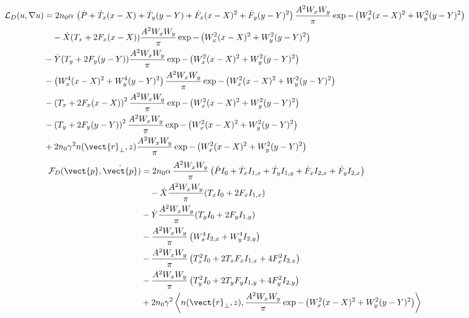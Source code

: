 \begin{equation}
    \begin{split}
    \mathcal{L}_{D}(u,\nabla u) & = 2 n_0 \alpha\, \left(\dot{P} + \dot{T}_x (x-X) + \dot{T}_y (y-Y) + \dot{F}_{x} (x-X)^2 + \dot{F}_{y} (y-Y)^2\right)\frac{A^2W_x W_y}{\pi} \exp{-\left( W_x^2(x-X)^2 + W_y^2(y-Y)^2 \right)} \\
        &\quad - \dot{X} (T_x + 2F_x(x-X)) \frac{A^2W_x W_y}{\pi} \exp{-\left( W_x^2(x-X)^2 + W_y^2(y-Y)^2 \right)}
\\
&- \dot{Y} (T_y + 2F_y(y-Y)) \frac{A^2W_x W_y}{\pi} \exp{-\left( W_x^2(x-X)^2 + W_y^2(y-Y)^2 \right)}
\\ 
        &- \left(W_x^4 (x-X)^2 +  W_y^4 (y-Y)^2\right) \frac{A^2W_x W_y}{\pi} \exp{-\left( W_x^2(x-X)^2 + W_y^2(y-Y)^2 \right)}
\\
        &- \left(T_x + 2 F_x (x-X)\right)^2 \frac{A^2W_x W_y}{\pi} \exp{-\left( W_x^2(x-X)^2 + W_y^2(y-Y)^2 \right)}
\\
        &-  \left(T_y + 2 F_{y} (y-Y)\right)^2 \frac{A^2W_x W_y}{\pi} \exp{-\left( W_x^2(x-X)^2 + W_y^2(y-Y)^2 \right)}
\\
        &+ 2n_0 \gamma^2 n(\vect{r}_{\perp},z) \frac{A^2W_x W_y}{\pi} \exp{-\left( W_x^2(x-X)^2 + W_y^2(y-Y)^2 \right)} \\
    \end{split}
\end{equation}
\begin{equation}
    \begin{split}
 \mathcal{F}_{D}(\vect{p},\dot{\vect{p}}) &= 2 n_0 \alpha\, \frac{A^2W_x W_y}{\pi} \left(\dot{P} I_0 + \dot{T}_x I_{1,x}  + \dot{T}_y I_{1,y} + \dot{F}_{x} I_{2,x} + \dot{F}_{y} I_{2,x}\right) \\
        &\quad - \dot{X} \frac{A^2W_x W_y}{\pi} (T_x I_0 + 2 F_x I_{1,x}) \\
&- \dot{Y}\frac{A^2W_x W_y}{\pi} (T_y I_0 + 2 F_y I_{1,y}) \\ 
        &- \frac{A^2W_x W_y}{\pi}\left(W_x^4 I_{2,x} +  W_y^4 I_{2,y}\right) \\
        &- \frac{A^2W_x W_y}{\pi}\left(T_x^2 I_0 + 2 T_{x} F_{x} I_{1,x} + 4 F_{x}^2 I_{2,x}\right) \\
        &- \frac{A^2W_x W_y}{\pi}\left(T_y^2 I_0 + 2 T_{y} F_{y} I_{1,y} + 4 F_{y}^2 I_{2,y}\right) \\
        &+ 2n_0 \gamma^2 \left<n(\vect{r}_{\perp},z), \frac{A^2W_x W_y}{\pi} \exp{-\left( W_x^2(x-X)^2 + W_y^2(y-Y)^2 \right)}\right>
    \end{split}
\end{equation}


